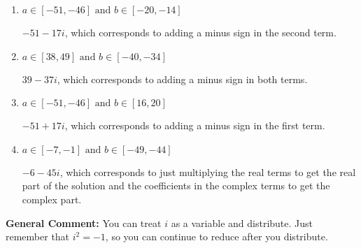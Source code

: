 \documentclass{extbook}[14pt]
\begin{document}
\begin{enumerate}
{\begin{enumerate}[label=\Alph*.]
* $39 + 37 i$, which is the correct option.
\item \( a \in [-51, -46] \text{ and } b \in [-20, -14] \)

 $-51 - 17 i$, which corresponds to adding a minus sign in the second term.
\item \( a \in [38, 49] \text{ and } b \in [-40, -34] \)

 $39 - 37 i$, which corresponds to adding a minus sign in both terms.
\item \( a \in [-51, -46] \text{ and } b \in [16, 20] \)

 $-51 + 17 i$, which corresponds to adding a minus sign in the first term.
\item \( a \in [-7, -1] \text{ and } b \in [-49, -44] \)

 $-6 - 45 i$, which corresponds to just multiplying the real terms to get the real part of the solution and the coefficients in the complex terms to get the complex part.
\end{enumerate}

\textbf{General Comment:} You can treat $i$ as a variable and distribute. Just remember that $i^2=-1$, so you can continue to reduce after you distribute.
}
\end{enumerate}
\end{document}
